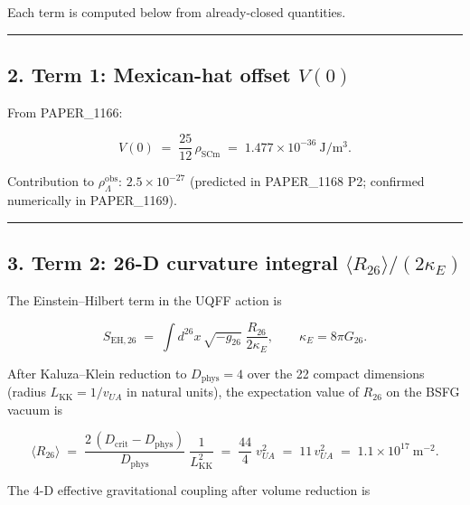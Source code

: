 \documentclass[
]{article}
\begin{document}
Each term is computed below from already-closed quantities.

\begin{center}\rule{0.5\linewidth}{0.5pt}\end{center}

\subsection{\texorpdfstring{2. Term 1: Mexican-hat offset
\(V(0)\)}{2. Term 1: Mexican-hat offset V(0)}}\label{term-1-mexican-hat-offset-v0}

From PAPER\_1166:

\[
V(0) \;=\; \frac{25}{12}\,\rho_{\mathrm{SCm}}
       \;=\; 1.477\times 10^{-36}\ \mathrm{J/m^3}.
\]

Contribution to \(\rho_{\Lambda}^{\mathrm{obs}}\):
\(2.5\times 10^{-27}\) (predicted in PAPER\_1168 P2; confirmed
numerically in PAPER\_1169).

\begin{center}\rule{0.5\linewidth}{0.5pt}\end{center}

\subsection{\texorpdfstring{3. Term 2: 26-D curvature integral
\(\langle R_{26}\rangle/(2\kappa_E)\)}{3. Term 2: 26-D curvature integral \textbackslash langle R\_\{26\}\textbackslash rangle/(2\textbackslash kappa\_E)}}\label{term-2-26-d-curvature-integral-langle-r_26rangle2kappa_e}

The Einstein--Hilbert term in the UQFF action is

\[
S_{\mathrm{EH},26} \;=\; \int d^{26}x\,\sqrt{-g_{26}}\;\frac{R_{26}}{2\kappa_E},
\qquad \kappa_E = 8\pi G_{26}.
\]

After Kaluza--Klein reduction to \(D_{\mathrm{phys}}=4\) over the 22
compact dimensions (radius \(L_{\mathrm{KK}} = 1/v_{UA}\) in natural
units), the expectation value of \(R_{26}\) on the BSFG vacuum is

\[
\langle R_{26}\rangle \;=\; \frac{2 \,(D_{\mathrm{crit}} - D_{\mathrm{phys}})}{D_{\mathrm{phys}}}\;
                     \frac{1}{L_{\mathrm{KK}}^{2}}
                  \;=\; \frac{44}{4}\;v_{UA}^{2}
                  \;=\; 11\, v_{UA}^{2}
                  \;=\; 1.1\times 10^{17}\ \mathrm{m^{-2}}.
\]

The 4-D effective gravitational coupling after volume reduction is
\end{document}
